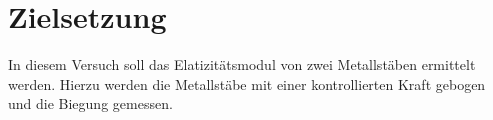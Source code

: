 \section{Zielsetzung}

In diesem Versuch soll das Elatizitätsmodul von zwei Metallstäben ermittelt werden.
Hierzu werden die Metallstäbe mit einer kontrollierten Kraft gebogen und die Biegung gemessen.